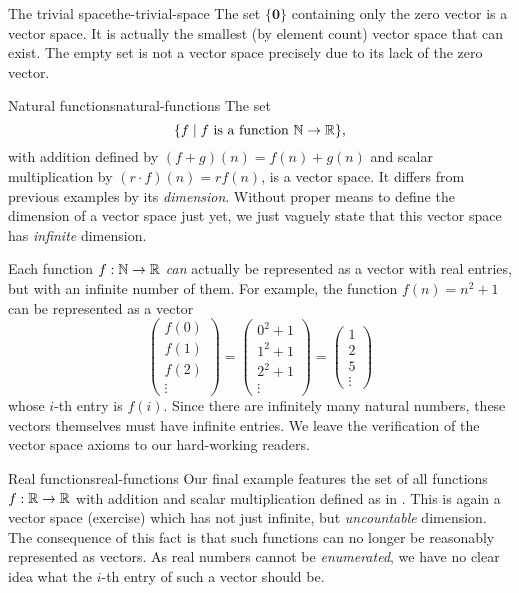 \begin{example}{The trivial space}{the-trivial-space}
 The set $\{\mathbf{0}\}$ containing only the zero vector is a vector space. It
 is actually the smallest (by element count) vector space that can exist. The
 empty set is not a vector space precisely due to its lack of the zero vector.
\end{example}

\begin{example}{Natural functions}{natural-functions}
 The set
 \[
  \{f \mid f \text{ is a function } \mathbb{N} \to \mathbb{R}\},
 \]
 with addition defined by $(f+g)(n) = f(n) + g(n)$ and scalar multiplication by
 $(r \cdot f)(n) = rf(n)$, is a vector space. It differs from previous examples
 by its \emph{dimension}. Without proper means to define the dimension of a
 vector space just yet, we just vaguely state that this vector space has
 \emph{infinite} dimension.

 Each function $f:\mathbb{N} \to \mathbb{R}$ \emph{can} actually be represented as a vector with
 real entries, but with an infinite number of them. For example, the function
 $f(n) = n^2 + 1$ can be represented as a vector
 \[
  \begin{pmatrix}
   f(0)\\
   f(1)\\
   f(2)\\
   \vdots
  \end{pmatrix} = 
  \begin{pmatrix}
   0^2 + 1\\
   1^2 + 1\\
   2^2 + 1\\
   \vdots
  \end{pmatrix}
  =
  \begin{pmatrix}
   1\\
   2\\
   5\\
   \vdots
  \end{pmatrix}
 \]
 whose $i$-th entry is $f(i)$. Since there are infinitely many natural numbers,
 these vectors themselves must have infinite entries. We leave the verification
 of the vector space axioms to our hard-working readers.
\end{example}

\begin{example}{Real functions}{real-functions}
 Our final example features the set of all functions $f:\mathbb{R} \to \mathbb{R}$ with addition
 and scalar multiplication defined as in
 . This is again a vector space
 (exercise) which has not just infinite, but \emph{uncountable} dimension. The
 consequence of this fact is that such functions can no longer be reasonably
 represented as vectors. As real numbers cannot be \emph{enumerated}, we have no
 clear idea what the $i$-th entry of such a vector should be.
\end{example}

